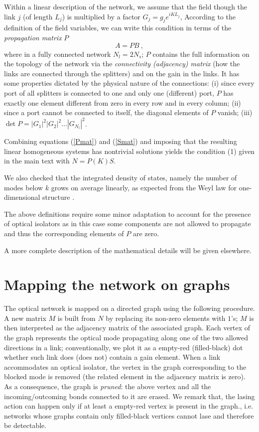 \documentclass[aps,prl,twocolumn,showpacs,amsmath,amssymb,floatfix,superscriptaddress,
]{revtex4-1}
\begin{document}
Within a linear description of the network, we assume that the field though the link $j$ (of length $L_j$) is multiplied by a factor $G_j = g_j e^{i K L_j}$, 
According to the definition of the field variables, we can write this condition 
in terms of the {\it propagation matrix} $P$
\begin{equation}
A = P B~,
\label{Pmat}
\end{equation}
where in a fully connected network $N_l = 2 N_s$; $P$ contains the full information on 
the topology of the network via the \textit{connectivity (adjacency) matrix} 
(how the links are connected through the splitters) 
and on the gain in the links. It has some properties dictated by the 
physical nature of the connections: (i) since every port of all splitters is connected to one and only one (different) port, $P$ has exactly one element different from zero 
in every row and in every column; (ii) since a port cannot be connected to itself, 
the diagonal elements of $P$ vanish; (iii) $\det P = |G_1|^2|G_2|^2\ldots |G_{N_l}|^2$.


Combining equations (\ref{Pmat}) and (\ref{Smat}) and imposing
that the resulting linear homogeneous systems has nontrivial solutions yields 
the condition (1) given in the main text with $N=P(K)S$.

We also checked that the integrated density of states, namely the number of modes below $k$ grows on average linearly, 
as expected from the Weyl law for one-dimensional structure
\citep{kottos1999periodic}.

The above definitions require some minor adaptation to account for the presence of optical isolators as in this case some components are not allowed to propagate
and thus the corresponding elements of $P$ are zero. 

A more complete description of the mathematical details will be given elsewhere.

\section{Mapping the network on graphs} 


The optical network is mapped on a directed graph using the following procedure. A new matrix $M$ is built from $N$ by replacing its non-zero elements with $1$'s; $M$ is then interpreted as the adjacency matrix of the associated graph. Each vertex of the graph represents the optical mode propagating along one of the two allowed directions in a link; conventionally, we plot it as a empty-red (filled-black) dot whether such link does (does not) contain a gain element. When a link accommodates an optical isolator, the vertex in the graph corresponding to the blocked mode is removed (the related element in the adjacency matrix is zero). As a consequence, the graph is {\it pruned}: the above vertex and all the incoming/outcoming bonds connected to it are erased. We remark that, the lasing action can happen only if at least a empty-red vertex is present in the graph., i.e. networks whose graphs contain only filled-black vertices cannot lase and therefore be detectable. 
\end{document}
